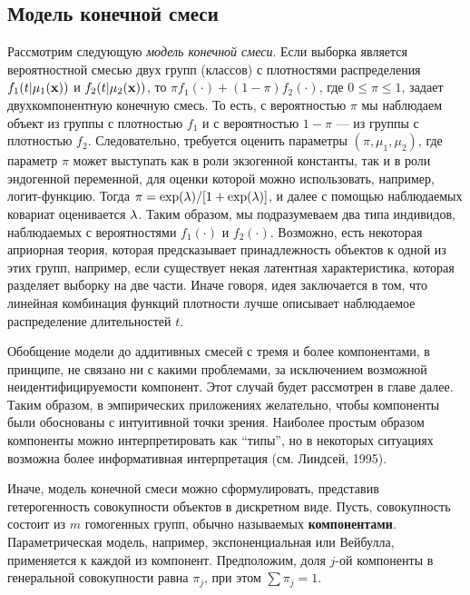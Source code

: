 \subsection{Модель конечной смеси}\label{sec:18.5.1}

\noindent
Рассмотрим следующую \textit{модель конечной смеси}. Если выборка является вероятностной смесью двух групп (классов) с плотностями распределения $f_1(t|\mu_1(\mathbf{x}))$ и $f_2(t|\mu_2(\mathbf{x}))$, то $\pi f_1(\cdot) + (1 - \pi)f_2(\cdot)$, где $0\le\pi\le1$, задает двухкомпонентную конечную смесь. То есть, с вероятностью $\pi$ мы наблюдаем объект из группы с плотностью $f_1$ и с вероятностью $1-\pi$ --- из группы с плотностью $f_2$. Следовательно, требуется оценить параметры $(\pi,\mu_1,\mu_2)$, где параметр $\pi$ может выступать как в роли экзогенной константы, так и в роли эндогенной переменной, для оценки которой можно использовать, например, логит-функцию. Тогда $\pi = \exp(\lambda)/[1+\exp(\lambda)]$, и далее с помощью наблюдаемых ковариат оценивается $\lambda$. Таким образом, мы подразумеваем два типа индивидов, наблюдаемых с вероятностями $f_1(\cdot)$ и $f_2(\cdot)$. Возможно, есть некоторая априорная теория, которая предсказывает принадлежность объектов к одной из этих групп, например, если существует некая латентная характеристика, которая разделяет выборку на две части. Иначе говоря, %
идея заключается в том, что линейная комбинация функций плотности лучше описывает наблюдаемое распределение длительностей $t$.

Обобщение модели до аддитивных смесей с тремя и более компонентами, в принципе, не связано ни с какими проблемами, за исключением возможной неидентифицируемости компонент. Этот случай будет рассмотрен в главе далее. %
Таким образом, в эмпирических приложениях желательно, чтобы компоненты были обоснованы с интуитивной точки зрения. Наиболее простым образом компоненты можно интерпретировать как ``типы'', но в некоторых ситуациях возможна более информативная интерпретация (см. Линдсей, 1995).

Иначе, модель конечной смеси можно сформулировать, представив гетерогенность совокупности объектов в дискретном виде. Пусть, совокупность состоит из $m$ гомогенных групп, обычно называемых \textbf{компонентами}. Параметрическая модель, например, экспоненциальная или Вейбулла, применяется к каждой из компонент. Предположим, доля $j$-ой компоненты в генеральной совокупности равна $\pi_j$, при этом $\sum\pi_j = 1$.

